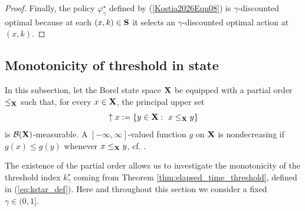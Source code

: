\documentclass[letterpaper,10pt,conference]{ieeeconf}  %
\let\cal\mathcal
\begin{document}
\begin{proof}
Finally, the policy {$\varphi^\star_\gamma$ defined by (\ref{Kostia2026Eqn08}) is $\gamma$-discounted} optimal {because at each $(x,k)\in {\bf S}$ it selects an $\gamma$-discounted optimal action at $(x,k)$}. 
\end{proof}


\subsection{Monotonicity of threshold in state}

{In this subsection}, let {the Borel state space} ${\bf X}$ be  equipped with a partial order {$\le_{\bf X}$}  such that, 
for every $x\in {\bf X}$, the principal upper set
\[
\uparrow x := \{y\in {\bf X}:\ {x\le_{\bf X} y} \}
\]
is ${\cal B}({\bf X})$-measurable.  {A $[-\infty,\infty]$-valued function $g$ on ${\bf X}$ is nondecreasing  if $g(x)\le g(y)$ whenever $x\le_{\bf X} y$, cf. \cite{Muller2002}.}


The existence of the partial order allows us to investigate
the monotonicity of the threshold index {$k_\gamma^\star$ coming from Theorem \ref{thm:elapsed_time_threshold}, defined in (\ref{eq:kstar_def}).} {Here and throughout this section we consider a fixed $\gamma\in(0,1].$}
\end{document}
